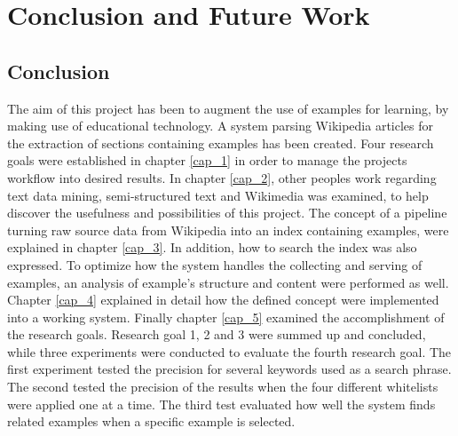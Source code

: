 
\chapter{Conclusion and Future Work}


\section{Conclusion}

The aim of this project has been to augment the use of examples for learning, by making use of educational technology. A system parsing Wikipedia articles for the extraction of sections containing examples has been created. Four research goals were established in chapter \ref{cap_1} in order to manage the projects workflow into desired results. In chapter \ref{cap_2}, other peoples work regarding text data mining, semi-structured text and Wikimedia was examined, to help discover the usefulness and possibilities of this project. The concept of a pipeline turning raw source data from Wikipedia into an index containing examples, were explained in chapter \ref{cap_3}. In addition, how to search the index was also expressed. To optimize how the system handles the collecting and serving of examples, an analysis of example's structure and content were performed as well. Chapter \ref{cap_4} explained in detail how the defined concept were implemented into a working system. Finally chapter \ref{cap_5} examined the accomplishment of the research goals. Research goal 1, 2 and 3 were summed up and concluded, while three experiments were conducted to evaluate the fourth research goal. The first experiment tested the precision for several keywords used as a search phrase. The second tested the precision of the results when the four different whitelists were applied one at a time. The third test evaluated how well the system finds related examples when a specific example is selected.

